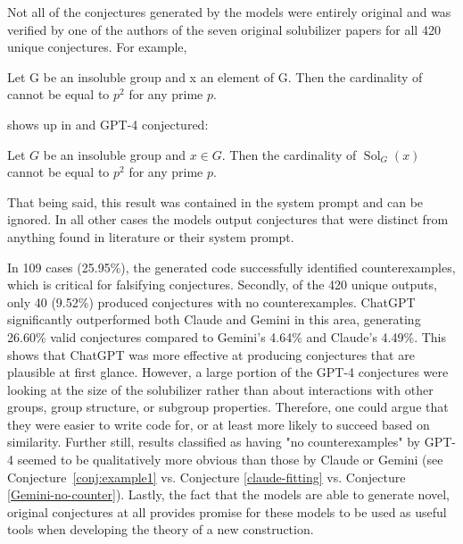 \documentclass{article}
\begin{document}
Not all of the conjectures generated by the models were entirely original and was verified by one of the authors of the seven original solubilizer papers for all 420 unique conjectures. For example, 
\begin{thm}
    Let G be an insoluble group and x an element of G. Then the cardinality of cannot be equal to \(p^2\)
 for any prime \(p\).
\end{thm}
shows up in \cite{akbari2022solubilizer} and GPT-4 conjectured:
\begin{conj}
    Let \( G \) be an insoluble group and \( x \in G \). Then the cardinality of \( \operatorname{Sol}_G(x) \) cannot be equal to \( p^2 \) for any prime \( p \).
\end{conj}
That being said, this result was contained in the system prompt and can be ignored. In all other cases the models output conjectures that were distinct from anything found in literature or their system prompt.

In 109 cases (25.95\%), the generated code successfully identified counterexamples, which is critical for falsifying conjectures. Secondly, of the 420 unique outputs, only 40 (9.52\%) produced conjectures with no counterexamples. ChatGPT significantly outperformed both Claude and Gemini in this area, generating 26.60\% valid conjectures compared to Gemini's 4.64\% and Claude’s 4.49\%. This shows that ChatGPT was more effective at producing conjectures that are plausible at first glance. However, a large portion of the GPT-4 conjectures were looking at the size of the solubilizer rather than about interactions with other groups, group structure, or subgroup properties. Therefore, one could argue that they were easier to write code for, or at least more likely to succeed based on similarity. Further still, results classified as having "no counterexamples" by GPT-4 seemed to be qualitatively more obvious than those by Claude or Gemini (see Conjecture~\ref{conj:example1} vs. Conjecture \ref{claude-fitting} vs. Conjecture \ref{Gemini-no-counter}). Lastly, the fact that the models are able to generate novel, original conjectures at all provides promise for these models to be used as useful tools when developing the theory of a new construction.
\end{document}
